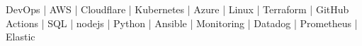 

\begin{cvparagraph}

\end{cvparagraph}

DevOps | AWS | Cloudflare  | Kubernetes | Azure | Linux | Terraform | GitHub Actions | SQL | nodejs | Python | Ansible | Monitoring | Datadog | Prometheus | Elastic

 


